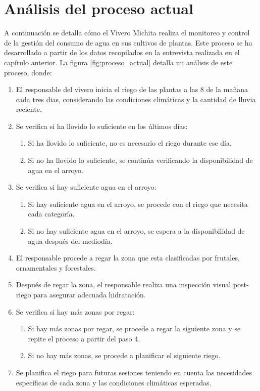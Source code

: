 \section{Análisis del proceso actual}

A continuación se detalla cómo el Vivero Michita realiza el monitoreo y control de la gestión del consumo de agua en sus cultivos de plantas. Este proceso se ha desarrollado a partir de los datos recopilados en la entrevista realizada en el capítulo anterior. La figura \ref{fig:proceso_actual} detalla un análisis de este proceso, donde:

\begin{enumerate}
    \item El responsable del vivero inicia el riego de las plantas a las 8 de la mañana cada tres dias, considerando las condiciones climáticas y la cantidad de lluvia reciente.
    \item Se verifica si ha llovido lo suficiente en los últimos días:
          \begin{enumerate}[label=(\alph*)]
              \item Si ha llovido lo suficiente, no es necesario el riego durante ese día.
              \item Si no ha llovido lo suficiente, se continúa verificando la disponibilidad de agua en el arroyo.
          \end{enumerate}
    \item Se verifica si hay suficiente agua en el arroyo:
          \begin{enumerate}[label=(\alph*)]
              \item Si hay suficiente agua en el arroyo, se procede con el riego que necesita cada categoría.
              \item Si no hay suficiente agua en el arroyo, se espera a la disponibilidad de agua después del mediodía.
          \end{enumerate}
    \item El responsable procede a regar la zona que esta clasificadas por frutales, ornamentales y forestales.
    \item Después de regar la zona, el responsable realiza una inspección visual post-riego para asegurar adecuada hidratación.
    \item Se verifica si hay más zonas por regar:
          \begin{enumerate}[label=(\alph*)]
              \item Si hay más zonas por regar, se procede a regar la siguiente zona y se repite el proceso a partir del paso 4.
              \item Si no hay más zonas, se procede a planificar el siguiente riego.
          \end{enumerate}
    \item Se planifica el riego para futuras sesiones teniendo en cuenta las necesidades específicas de cada zona y las condiciones climáticas esperadas.
\end{enumerate}

